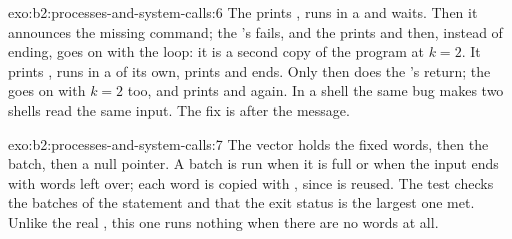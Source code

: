 \begin{solution}{exo:b2:processes-and-system-calls:6}
The  prints , runs  in a  and waits. Then it
announces the missing command; the 's  fails, and the  prints  and then, instead of
ending, goes on with the loop: it is a second copy of the program at $k = 2$. It prints , runs
 in a  of its own, prints  and ends. Only then does the 's  return; the
 goes on with $k = 2$ too, and prints  and  again. In a shell the same bug makes
two shells read the same input. The fix is  after the message.
\end{solution}

\begin{solution}{exo:b2:processes-and-system-calls:7}
The vector holds the fixed words, then the batch, then a null pointer. A batch is run when it is full or when the
input ends with words left over; each word is copied with , since  is reused. The test checks
the batches of the statement and that the exit status is the largest one met. Unlike the real , this one
runs nothing when there are no words at all.
\end{solution}

